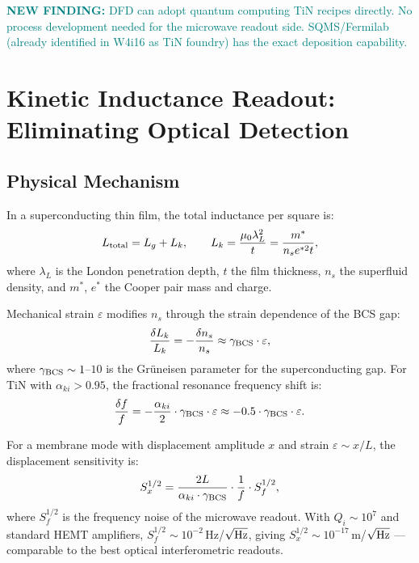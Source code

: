 \documentclass[11pt]{article}
\theoremstyle{remark}
\newcommand{\newfinding}[1]{\textcolor{teal}{\textbf{NEW FINDING:} #1}}
\begin{document}
\newfinding{DFD can adopt quantum computing TiN recipes directly.
No process development needed for the microwave readout side.
SQMS/Fermilab (already identified in W4i16 as TiN foundry) has
the exact deposition capability.}


\section{Kinetic Inductance Readout: Eliminating Optical Detection}
\label{sec:KI}

\subsection{Physical Mechanism}

In a superconducting thin film, the total inductance per square is:
\begin{equation}
  L_{\rm total} = L_g + L_k, \qquad
  L_k = \frac{\mu_0 \lambda_L^2}{t} = \frac{m^*}{n_s e^{*2} t},
\end{equation}
where $\lambda_L$ is the London penetration depth, $t$ the film thickness,
$n_s$ the superfluid density, and $m^*$, $e^*$ the Cooper pair mass and charge.

Mechanical strain $\varepsilon$ modifies $n_s$ through the strain dependence
of the BCS gap:
\begin{equation}
  \frac{\delta L_k}{L_k} = -\frac{\delta n_s}{n_s}
  \approx \gamma_{\rm BCS} \cdot \varepsilon,
\end{equation}
where $\gamma_{\rm BCS} \sim 1$--$10$ is the Gr\"uneisen parameter for the
superconducting gap. For TiN with $\alpha_{ki} > 0.95$, the fractional
resonance frequency shift is:
\begin{equation}
  \frac{\delta f}{f} = -\frac{\alpha_{ki}}{2} \cdot \gamma_{\rm BCS}
  \cdot \varepsilon
  \approx -0.5 \cdot \gamma_{\rm BCS} \cdot \varepsilon.
\end{equation}

For a membrane mode with displacement amplitude $x$ and strain
$\varepsilon \sim x/L$, the displacement sensitivity is:
\begin{equation}
  S_x^{1/2} = \frac{2L}{\alpha_{ki} \cdot \gamma_{\rm BCS}}
  \cdot \frac{1}{f} \cdot S_f^{1/2},
\end{equation}
where $S_f^{1/2}$ is the frequency noise of the microwave readout.
With $Q_i \sim 10^7$ and standard HEMT amplifiers,
$S_f^{1/2} \sim 10^{-2}$\,Hz/$\sqrt{\rm Hz}$, giving
$S_x^{1/2} \sim 10^{-17}$\,m/$\sqrt{\rm Hz}$ --- comparable to the
best optical interferometric readouts.
\end{document}
